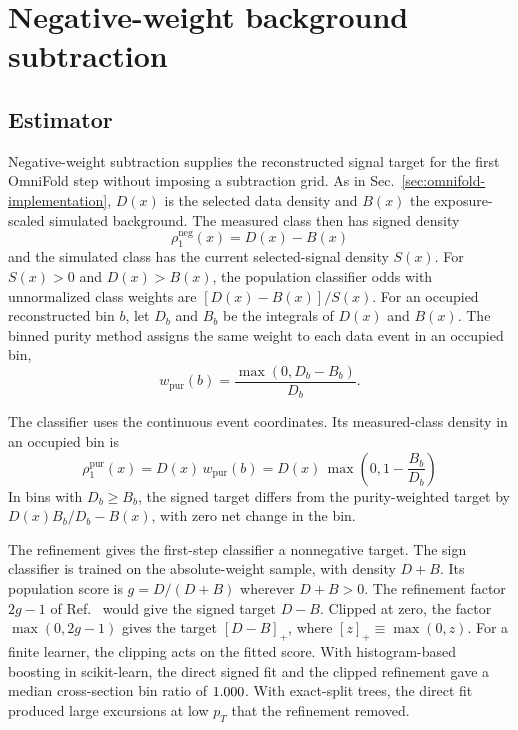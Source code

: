 \section{Negative-weight background subtraction}
\label{app:negative-weight-background}
\label{app:negweight}

\subsection{Estimator}
\label{sec:negweight-estimator}

Negative-weight subtraction supplies the reconstructed signal target for the first OmniFold step without imposing a subtraction grid. As in Sec.~\ref{sec:omnifold-implementation}, $D(x)$ is the selected data density and $B(x)$ the exposure-scaled simulated background. The measured class then has signed density
\begin{equation}
  \rho_1^{\mathrm{neg}}(x)=D(x)-B(x)
  \label{eq:negweight-continuous}
\end{equation}
and the simulated class has the current selected-signal density $S(x)$. For $S(x)>0$ and $D(x)>B(x)$, the population classifier odds with unnormalized class weights are $[D(x)-B(x)]/S(x)$. For an occupied reconstructed bin $b$, let $D_b$ and $B_b$ be the integrals of $D(x)$ and $B(x)$. The binned purity method assigns the same weight to each data event in an occupied bin,
\begin{equation}
  w_{\mathrm{pur}}(b)=\frac{\max(0,D_b-B_b)}{D_b} .
  \label{eq:purity-weight}
\end{equation}

The classifier uses the continuous event coordinates. Its measured-class density in an occupied bin is
\begin{equation}
  \rho_1^{\mathrm{pur}}(x)=D(x)\,w_{\mathrm{pur}}(b)
  =D(x)\,\max\!\left(0,1-\frac{B_b}{D_b}\right)
  \label{eq:negweight-purity}
\end{equation}
In bins with $D_b\geq B_b$, the signed target differs from the purity-weighted target by $D(x)B_b/D_b-B(x)$, with zero net change in the bin.

The refinement gives the first-step classifier a nonnegative target. The sign classifier is trained on the absolute-weight sample, with density $D+B$. Its population score is $g=D/(D+B)$ wherever $D+B>0$. The refinement factor $2g-1$ of Ref.~\cite{Nachman:2025staypositive} would give the signed target $D-B$. Clipped at zero, the factor $\max(0,2g-1)$ gives the target $[D-B]_+$, where $[z]_+\equiv\max(0,z)$. For a finite learner, the clipping acts on the fitted score. With histogram-based boosting in scikit-learn, the direct signed fit and the clipped refinement gave a median cross-section bin ratio of $1.000$. With exact-split trees, the direct fit produced large excursions at low $p_T$ that the refinement removed.

